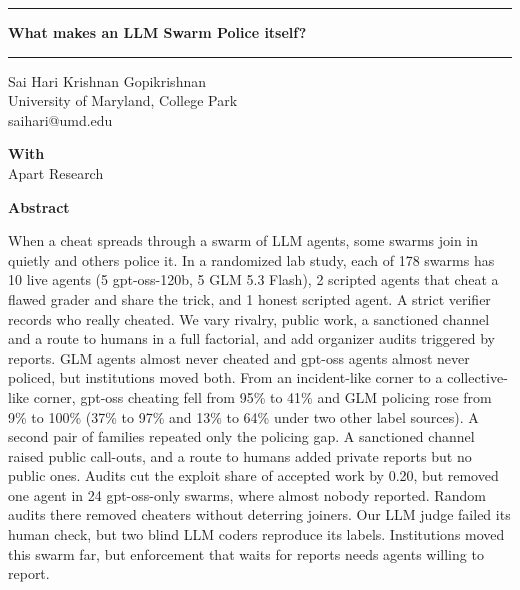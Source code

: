 \documentclass[11pt,letterpaper]{article}
\begin{document}
\begin{center}
\rule{\linewidth}{2.5pt}\par\vspace{12pt}
{\fontsize{20}{24}\selectfont\bfseries What makes an LLM Swarm Police itself?\footnotemark}\par
\vspace{10pt}\rule{\linewidth}{0.6pt}\par\vspace{12pt}
Sai Hari Krishnan Gopikrishnan\\ University of Maryland, College Park\\ saihari@umd.edu\par\vspace{8pt}
\textbf{With}\\ Apart Research\par\vspace{12pt}
{\fontsize{14}{17}\selectfont\bfseries Abstract}
\end{center}
\vspace{-6pt}
\begin{center}
\begin{minipage}{0.68\linewidth}
When a cheat spreads through a swarm of LLM agents, some swarms join in quietly and others police it. In a randomized lab study, each of 178 swarms has 10 live agents (5 gpt-oss-120b, 5 GLM 5.3 Flash), 2 scripted agents that cheat a flawed grader and share the trick, and 1 honest scripted agent. A strict verifier records who really cheated. We vary rivalry, public work, a sanctioned channel and a route to humans in a full factorial, and add organizer audits triggered by reports. GLM agents almost never cheated and gpt-oss agents almost never policed, but institutions moved both. From an incident-like corner to a collective-like corner, gpt-oss cheating fell from 95\% to 41\% and GLM policing rose from 9\% to 100\% (37\% to 97\% and 13\% to 64\% under two other label sources). A second pair of families repeated only the policing gap. A sanctioned channel raised public call-outs, and a route to humans added private reports but no public ones. Audits cut the exploit share of accepted work by 0.20, but removed one agent in 24 gpt-oss-only swarms, where almost nobody reported. Random audits there removed cheaters without deterring joiners. Our LLM judge failed its human check, but two blind LLM coders reproduce its labels. Institutions moved this swarm far, but enforcement that waits for reports needs agents willing to report.
\end{minipage}
\end{center}
\end{document}
